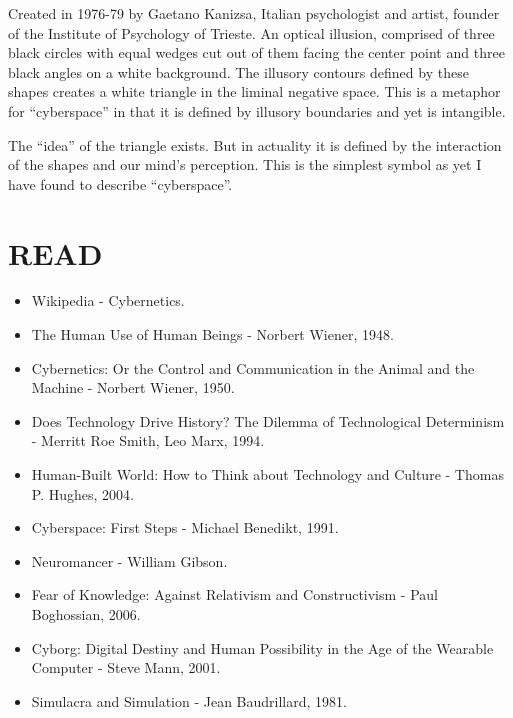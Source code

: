 \documentclass[letterpaper,12pt,english]{sphinxmanual}
\begin{document}
Created in 1976-79 by Gaetano Kanizsa, Italian psychologist and artist, founder of the Institute of Psychology of Trieste. An optical illusion, comprised of three black circles with equal wedges cut out of them facing the center point and three black angles on a white background. The illusory contours defined by these shapes creates a white triangle in the liminal negative space. This is a metaphor for ``cyberspace'' in that it is defined by illusory boundaries and yet is intangible.

The ``idea'' of the triangle exists. But in actuality it is defined by the interaction of the shapes and our mind's perception. This is the simplest symbol as yet I have found to describe ``cyberspace''.


\section{READ}
\label{2011:read}\begin{itemize}
\item {} 
Wikipedia - Cybernetics.

\item {} 
The Human Use of Human Beings - Norbert Wiener, 1948.

\item {} 
Cybernetics: Or the Control and Communication in the Animal and the Machine - Norbert Wiener, 1950.

\item {} 
Does Technology Drive History? The Dilemma of Technological Determinism - Merritt Roe Smith, Leo Marx, 1994.

\item {} 
Human-Built World: How to Think about Technology and Culture - Thomas P. Hughes, 2004.

\item {} 
Cyberspace: First Steps - Michael Benedikt, 1991.

\item {} 
Neuromancer - William Gibson.

\item {} 
Fear of Knowledge: Against Relativism and Constructivism - Paul Boghossian, 2006.

\item {} 
Cyborg: Digital Destiny and Human Possibility in the Age of the Wearable Computer - Steve Mann, 2001.

\item {} 
Simulacra and Simulation - Jean Baudrillard, 1981.

\end{itemize}
\end{document}
